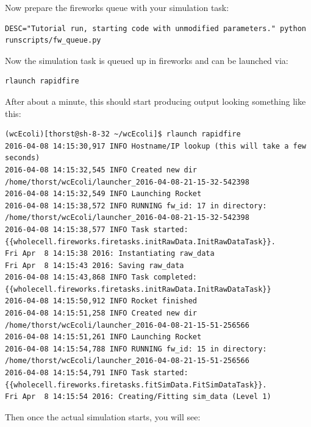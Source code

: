 \documentclass[12pt]{article}
\begin{document}
Now prepare the fireworks queue with your simulation task:

\begin{lstlisting}
DESC="Tutorial run, starting code with unmodified parameters." python runscripts/fw_queue.py
\end{lstlisting}

Now the simulation task is queued up in fireworks and can be launched via:

\begin{lstlisting}
rlaunch rapidfire
\end{lstlisting}

After about a minute, this should start producing output looking something like this:

\begin{lstlisting}
(wcEcoli)[thorst@sh-8-32 ~/wcEcoli]$ rlaunch rapidfire
2016-04-08 14:15:30,917 INFO Hostname/IP lookup (this will take a few seconds)
2016-04-08 14:15:32,545 INFO Created new dir /home/thorst/wcEcoli/launcher_2016-04-08-21-15-32-542398
2016-04-08 14:15:32,549 INFO Launching Rocket
2016-04-08 14:15:38,572 INFO RUNNING fw_id: 17 in directory: /home/thorst/wcEcoli/launcher_2016-04-08-21-15-32-542398
2016-04-08 14:15:38,577 INFO Task started: {{wholecell.fireworks.firetasks.initRawData.InitRawDataTask}}.
Fri Apr  8 14:15:38 2016: Instantiating raw_data
Fri Apr  8 14:15:43 2016: Saving raw_data
2016-04-08 14:15:43,868 INFO Task completed: {{wholecell.fireworks.firetasks.initRawData.InitRawDataTask}} 
2016-04-08 14:15:50,912 INFO Rocket finished
2016-04-08 14:15:51,258 INFO Created new dir /home/thorst/wcEcoli/launcher_2016-04-08-21-15-51-256566
2016-04-08 14:15:51,261 INFO Launching Rocket
2016-04-08 14:15:54,788 INFO RUNNING fw_id: 15 in directory: /home/thorst/wcEcoli/launcher_2016-04-08-21-15-51-256566
2016-04-08 14:15:54,791 INFO Task started: {{wholecell.fireworks.firetasks.fitSimData.FitSimDataTask}}.
Fri Apr  8 14:15:54 2016: Creating/Fitting sim_data (Level 1)
 \end{lstlisting}

\hfill \break

Then once the actual simulation starts, you will see:

\hfill \break
\end{document}
